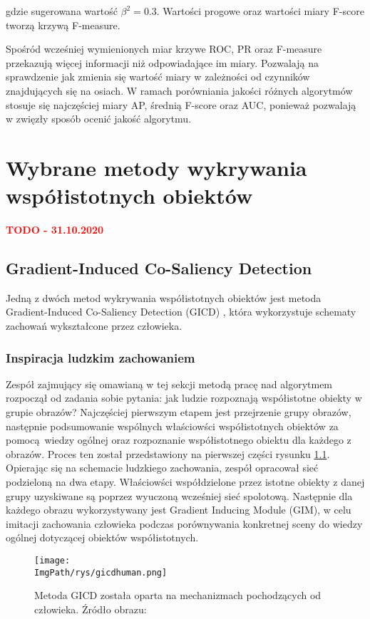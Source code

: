 \documentclass[a4paper,12pt,twoside,openany]{report}
\newcommand{\ImgPath}{.}
\begin{document}
	gdzie sugerowana wartość $\beta^2 = 0.3$. Wartości progowe oraz wartości miary F-score tworzą krzywą F-measure. 

	Spośród wcześniej wymienionych miar krzywe ROC, PR oraz F-measure przekazują więcej informacji niż odpowiadające im miary. Pozwalają na sprawdzenie jak zmienia się wartość miary w zależności od czynników znajdujących się na osiach. W ramach porówniania jakości różnych algorytmów stosuje się najczęściej miary AP, średnią F-score oraz AUC, ponieważ pozwalają w zwięzły sposób ocenić jakość algorytmu. 


\chapter{Wybrane metody wykrywania współistotnych obiektów}
\textcolor{red}{\textbf{TODO - 31.10.2020}}
\section{Gradient-Induced Co-Saliency Detection}

Jedną z dwóch metod wykrywania współistotnych obiektów jest metoda Gradient-Induced Co-Saliency Detection (GICD) \cite{zhang2020gradientinduced}, która wykorzystuje schematy zachowań wykształcone przez człowieka.

\subsection{Inspiracja ludzkim zachowaniem}
Zespół zajmujący się omawianą w tej sekcji metodą pracę nad algorytmem rozpoczął od zadania sobie pytania: jak ludzie rozpoznają współistotne obiekty w grupie obrazów? Najczęściej pierwszym etapem jest przejrzenie grupy obrazów, następnie podsumowanie wspólnych właściowści współistotnych obiektów za pomocą wiedzy ogólnej oraz rozpoznanie współistotnego obiektu dla każdego z obrazów. Proces ten został przedstawiony na pierwszej części rysunku \ref{GICDhuman}. Opierając się na schemacie ludzkiego zachowania, zespół opracował sieć podzieloną na dwa etapy. Właściowści współdzielone przez istotne obiekty z danej grupy uzyskiwane są poprzez wyuczoną wcześniej sieć spolotową. Następnie dla każdego obrazu wykorzystywany jest Gradient Inducing Module (GIM), w celu imitacji zachowania człowieka podczas porównywania konkretnej sceny do wiedzy ogólnej dotyczącej obiektów współistotnych.

\begin{figure}[h]
	\centering
	\texttt{[image: \\ImgPath/rys/gicdhuman.png]}
	\caption{Metoda GICD została oparta na mechanizmach pochodzących od człowieka. Źródło obrazu: \cite{zhang2020gradientinduced}}
	\label{GICDhuman}
\end{figure}
\end{document}
